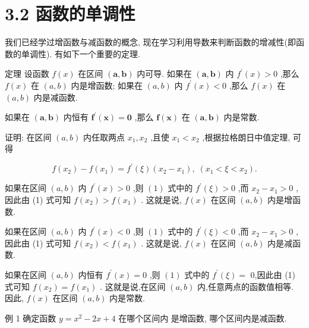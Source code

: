 \documentclass[10pt]{article}
\begin{document}
\section*{3.2 函数的单调性}

我们已经学过增函数与减函数的概念, 现在学习利用导数来判断函数的增减性(即函数的单调性). 有如下一个重要的定理.

定理 设函数 \(f\left( x\right)\) 在区间 \(\left( {\mathbf{a},\mathbf{b}}\right)\) 内可导. 如果在 \(\left( {\mathbf{a},\mathbf{b}}\right)\) 内 \({f}^{\prime }\left( x\right) > 0\) ,那么 \(f\left( x\right)\) 在 \(\left( {a,b}\right)\) 内是增函数; 如果在 \(\left( {a,b}\right)\) 内 \({f}^{\prime }\left( x\right) < 0\) ,那么 \(f\left( x\right)\) 在 \(\left( {a,b}\right)\) 内是减函数.

如果在 \(\left( {\mathbf{a},\mathbf{b}}\right)\) 内恒有 \({\mathbf{f}}^{\prime }\left( \mathbf{x}\right) = \mathbf{0}\) ,那么 \(\mathbf{f}\left( \mathbf{x}\right)\) 在 \(\left( {\mathbf{a},\mathbf{b}}\right)\) 内是常数.

证明: 在区间 \(\left( {a,b}\right)\) 内任取两点 \({x}_{1},{x}_{2}\) ,且使 \({x}_{1} < {x}_{2}\) ,根据拉格朗日中值定理, 可得

\[
f\left( {x}_{2}\right) - f\left( {x}_{1}\right) = {f}^{\prime }\left( \xi \right) \left( {{x}_{2} - {x}_{1}}\right) ,\;\left( {{x}_{1} < \xi < {x}_{2}}\right) . \tag{1}
\]

如果在区间 \(\left( {a,b}\right)\) 内 \({f}^{\prime }\left( x\right) > 0\) ,则 \(\left( 1\right)\) 式中的 \({f}^{\prime }\left( \xi \right) > 0\) ,而 \({x}_{2} - {x}_{1} > 0\) ,因此由 (1) 式可知 \(f\left( {x}_{2}\right) > f\left( {x}_{1}\right)\) . 这就是说, \(f\left( x\right)\) 在区间 \(\left( {a,b}\right)\) 内是增函数.

如果在区间 \(\left( {a,b}\right)\) 内 \({f}^{\prime }\left( x\right) < 0\) ,则 \(\left( 1\right)\) 式中的 \({f}^{\prime }\left( \xi \right) < 0\) ,而 \({x}_{2} - {x}_{1} > 0\) ,因此由 (1) 式可知 \(f\left( {x}_{2}\right) < f\left( {x}_{1}\right)\) . 这就是说, \(f\left( x\right)\) 在区间 \(\left( {a,b}\right)\) 内是减函数.

如果在区间 \(\left( {a,b}\right)\) 内恒有 \({f}^{\prime }\left( x\right) = 0\) ,则 \(\left( 1\right)\) 式中的 \({f}^{\prime }\left( \xi \right) =\) 0,因此由 (1) 式可知 \(f\left( {x}_{2}\right) = f\left( {x}_{1}\right)\) . 这就是说,在区间 \(\left( {a,b}\right)\) 内,任意两点的函数值相等. 因此, \(f\left( x\right)\) 在区间 \(\left( {a,b}\right)\) 内是常数.

例 1 确定函数 \(y = {x}^{2} - {2x} + 4\) 在哪个区间内 是增函数, 哪个区间内是减函数.
\end{document}
